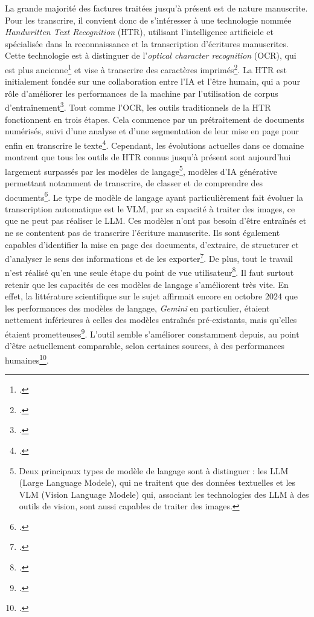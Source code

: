 La grande majorité des factures traitées jusqu'à présent est de nature manuscrite. Pour les transcrire, il convient donc de s'intéresser à une technologie nommée \emph{Handwritten Text Recognition} (HTR), utilisant l'intelligence artificiele et spécialisée dans la reconnaissance et la transcription d'écritures manuscrites. Cette technologie est à distinguer de l'\emph{optical character recognition} (OCR), qui est plus ancienne\footcite[Voir][La naissance de l'OCR est souvent attribuée au physicien Emmanuel Goldberg qui, durant la Première Guerre mondiale, invente une machine permettant de lire des caractères et de les convertir en code télégraphique]{lefevre_locr_2023} et vise à transcrire des caractères imprimés\footcite[p. 1]{gutteridge_judge_2026}. La HTR est initialement fondée sur une collaboration entre l'IA et l'être humain, qui a pour rôle d'améliorer les performances de la machine par l'utilisation de corpus d'entraînement\footcite{pinche_2022}. Tout comme l'OCR, les outils traditionnels de la HTR fonctionnent en trois étapes. Cela commence par un prétraitement de documents numérisés, suivi d'une analyse et d'une segmentation de leur mise en page pour enfin en transcrire le texte\footcite[p. 1]{kim_early_2025}. 
Cependant, les évolutions actuelles dans ce domaine montrent que tous les outils de HTR connus jusqu'à présent sont aujourd'hui largement surpassés par les modèles de langage\footnote{Deux principaux types de modèle de langage sont à distinguer : les LLM (Large Language Modele), qui ne traitent que des données textuelles et les VLM (Vision Language Modele) qui, associant les technologies des LLM à des outils de vision, sont aussi capables de traiter des images.}, modèles d'IA générative permettant notamment de transcrire, de classer et de comprendre des documents\footcite[p. 1]{crosilla_benchmarking_2025}. Le type de modèle de langage ayant particulièrement fait évoluer la transcription automatique est le VLM, par sa capacité à traiter des images, ce que ne peut pas réaliser le LLM. Ces modèles n'ont pas besoin d'être entraînés et ne se contentent pas de transcrire l'écriture manuscrite. Ils sont également capables d'identifier la mise en page des documents, d'extraire, de structurer et d'analyser le sens des informations et de les exporter\footcite{sebastien_cretin_2025}. De plus, tout le travail n'est réalisé qu'en une seule étape du point de vue utilisateur\footcite[p. 1]{kim_early_2025}. Il faut surtout retenir que les capacités de ces modèles de langage s'améliorent très vite. En effet, la littérature scientifique sur le sujet affirmait encore en octobre 2024 que les performances des modèles de langage, \emph{Gemini} en particulier, étaient nettement inférieures à celles des modèles entraînés pré-existants, mais qu'elles étaient prometteuses\footcite[p. 4-6]{li_handwriting_2024}. L'outil semble s'améliorer constamment depuis, au point d'être actuellement comparable, selon certaines sources, à des performances humaines\footcite{humphries_gemini_2025}. 


